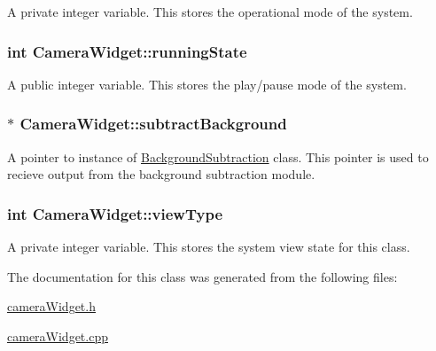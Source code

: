 \label{classCameraWidget_a9816f938d5bf155f91bbaa86f66fd1dd}
A private integer variable. This stores the operational mode of the system. \hypertarget{classCameraWidget_a76aca1e4016b0365c643993322b93b47}{
\subsubsection[{runningState}]{\setlength{\rightskip}{0pt plus 5cm}int {\bf CameraWidget::runningState}}}
\label{classCameraWidget_a76aca1e4016b0365c643993322b93b47}
A public integer variable. This stores the play/pause mode of the system. \hypertarget{classCameraWidget_a395a84c275e7b80005f0fa8193b136b2}{
\subsubsection[{subtractBackground}]{$\ast$ {\bf CameraWidget::subtractBackground}}}
\label{classCameraWidget_a395a84c275e7b80005f0fa8193b136b2}
A pointer to instance of \hyperlink{classBackgroundSubtraction}{BackgroundSubtraction} class. This pointer is used to recieve output from the background subtraction module. \hypertarget{classCameraWidget_a1e443b2b7aeeefe58b4c238930d0dd90}{
\subsubsection[{viewType}]{\setlength{\rightskip}{0pt plus 5cm}int {\bf CameraWidget::viewType}}}
\label{classCameraWidget_a1e443b2b7aeeefe58b4c238930d0dd90}
A private integer variable. This stores the system view state for this class. 

The documentation for this class was generated from the following files:\begin{DoxyCompactItemize}
\item 
\hyperlink{cameraWidget_8h}{cameraWidget.h}\item 
\hyperlink{cameraWidget_8cpp}{cameraWidget.cpp}\end{DoxyCompactItemize}
